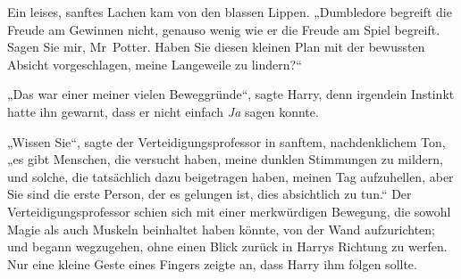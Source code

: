 Ein leises, sanftes Lachen kam von den blassen Lippen.
„Dumbledore begreift die Freude am Gewinnen nicht, genauso wenig wie er die Freude am Spiel begreift. Sagen Sie mir, Mr~Potter. Haben Sie diesen kleinen Plan mit der bewussten Absicht vorgeschlagen, meine Langeweile zu lindern?“

„Das war einer meiner vielen Beweggründe“, sagte Harry, denn irgendein Instinkt hatte ihn gewarnt, dass er nicht einfach \emph{Ja} sagen konnte.

„Wissen Sie“, sagte der Verteidigungsprofessor in sanftem, nachdenklichem Ton, „es gibt Menschen, die versucht haben, meine dunklen Stimmungen zu mildern, und solche, die tatsächlich dazu beigetragen haben, meinen Tag aufzuhellen, aber Sie sind die erste Person, der es gelungen ist, dies absichtlich zu tun.“ Der Verteidigungsprofessor schien sich mit einer merkwürdigen Bewegung, die sowohl Magie als auch Muskeln beinhaltet haben könnte, von der Wand aufzurichten; und begann wegzugehen, ohne einen Blick zurück in Harrys Richtung zu werfen. Nur eine kleine Geste eines Fingers zeigte an, dass Harry ihm folgen sollte.

